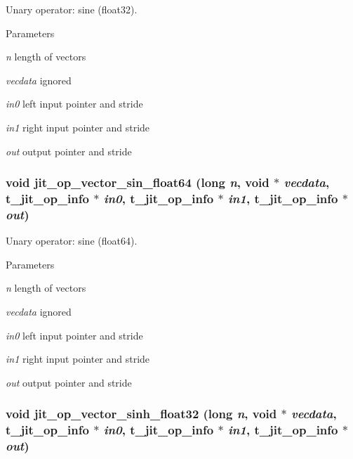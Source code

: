 Unary operator: sine (float32). 
\begin{DoxyParams}{Parameters}
\item[{\em n}]length of vectors \item[{\em vecdata}]ignored \item[{\em in0}]left input pointer and stride \item[{\em in1}]right input pointer and stride \item[{\em out}]output pointer and stride \end{DoxyParams}
\hypertarget{group__opvecmod_ga12fa0c0f124217b6703c6f02bccee9d2}{
\subsubsection[{jit\_\-op\_\-vector\_\-sin\_\-float64}]{\setlength{\rightskip}{0pt plus 5cm}void jit\_\-op\_\-vector\_\-sin\_\-float64 (long {\em n}, \/  void $\ast$ {\em vecdata}, \/  {\bf t\_\-jit\_\-op\_\-info} $\ast$ {\em in0}, \/  {\bf t\_\-jit\_\-op\_\-info} $\ast$ {\em in1}, \/  {\bf t\_\-jit\_\-op\_\-info} $\ast$ {\em out})}}
\label{group__opvecmod_ga12fa0c0f124217b6703c6f02bccee9d2}


Unary operator: sine (float64). 
\begin{DoxyParams}{Parameters}
\item[{\em n}]length of vectors \item[{\em vecdata}]ignored \item[{\em in0}]left input pointer and stride \item[{\em in1}]right input pointer and stride \item[{\em out}]output pointer and stride \end{DoxyParams}
\hypertarget{group__opvecmod_gae9e0f85188a1b8e4e6bb9bc717edf3cf}{
\subsubsection[{jit\_\-op\_\-vector\_\-sinh\_\-float32}]{\setlength{\rightskip}{0pt plus 5cm}void jit\_\-op\_\-vector\_\-sinh\_\-float32 (long {\em n}, \/  void $\ast$ {\em vecdata}, \/  {\bf t\_\-jit\_\-op\_\-info} $\ast$ {\em in0}, \/  {\bf t\_\-jit\_\-op\_\-info} $\ast$ {\em in1}, \/  {\bf t\_\-jit\_\-op\_\-info} $\ast$ {\em out})}}
\label{group__opvecmod_gae9e0f85188a1b8e4e6bb9bc717edf3cf}


